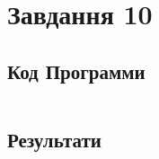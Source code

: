 \section{Завдання 10}
\label{sec:task10}

\subsection{Код Программи}
\label{subsec:task10_code}
\inputminted{python}{../src/task10.py}

\subsection{Результати}
\label{subsec:task10_results}
